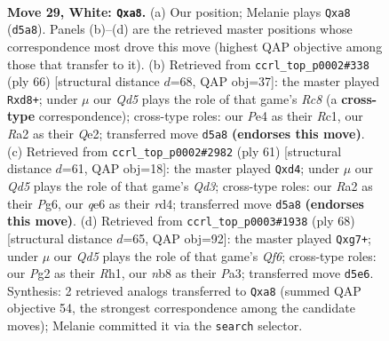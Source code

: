 \documentclass[11pt]{article}
\begin{document}
\clearpage

\begin{figure}[p]\centering
\begin{subfigure}{0.46\textwidth}\centering
\resizebox{\linewidth}{!}{%
\newchessgame
\chessboard[
  setfen={rn5r/5k2/1p1pq3/pPpQ4/4P3/7P/RP4P1/2K4R w - - 2 29},
  showmover=false,
  pgfstyle=straightmove, color=movearrow, markmove={d5-a8}
]}
\caption{}
\end{subfigure}\hfill
\begin{subfigure}{0.46\textwidth}\centering
\resizebox{\linewidth}{!}{%
\newchessgame
\chessboard[
  setfen={2Rr2k1/p4p2/3qp1p1/7p/1P1r4/P6P/4QPP1/2R3K1 w - - 3 34},
  showmover=false,
  pgfstyle=straightmove, color=movearrow, markmove={c8-d8}
]}
\caption{}
\end{subfigure}
\\[4pt]
\begin{subfigure}{0.46\textwidth}\centering
\resizebox{\linewidth}{!}{%
\newchessgame
\chessboard[
  setfen={8/5k2/p2qp1pp/1p3r2/3R4/1Q4PP/P4P2/4R1K1 b - - 0 31},
  showmover=false,
  pgfstyle=straightmove, color=movearrow, markmove={d6-d4}
]}
\caption{}
\end{subfigure}\hfill
\begin{subfigure}{0.46\textwidth}\centering
\resizebox{\linewidth}{!}{%
\newchessgame
\chessboard[
  setfen={r6k/p1rp1Pqp/4pQ2/8/8/P4PP1/1P6/R3K2R w KQ - 1 35},
  showmover=false,
  pgfstyle=straightmove, color=movearrow, markmove={f6-g7}
]}
\caption{}
\end{subfigure}
\caption{\textbf{Move 29, White: \texttt{Qxa8}.} (a) Our position; Melanie plays \texttt{Qxa8} (\texttt{d5a8}). Panels (b)--(d) are the retrieved master positions whose correspondence most drove this move (highest QAP objective among those that transfer to it). (b) Retrieved from \texttt{ccrl\_top\_p0002\#338} (ply 66) [structural distance $d$=68, QAP obj=37]: the master played \texttt{Rxd8+}; under $\mu$ our \emph{Qd5} plays the role of that game's \emph{Rc8} (a \textbf{cross-type} correspondence); cross-type roles: our \emph{P}e4 as their \emph{R}c1, our \emph{R}a2 as their \emph{Q}e2; transferred move \texttt{d5a8} \textbf{(endorses this move)}. (c) Retrieved from \texttt{ccrl\_top\_p0002\#2982} (ply 61) [structural distance $d$=61, QAP obj=18]: the master played \texttt{Qxd4}; under $\mu$ our \emph{Qd5} plays the role of that game's \emph{Qd3}; cross-type roles: our \emph{R}a2 as their \emph{P}g6, our \emph{q}e6 as their \emph{r}d4; transferred move \texttt{d5a8} \textbf{(endorses this move)}. (d) Retrieved from \texttt{ccrl\_top\_p0003\#1938} (ply 68) [structural distance $d$=65, QAP obj=92]: the master played \texttt{Qxg7+}; under $\mu$ our \emph{Qd5} plays the role of that game's \emph{Qf6}; cross-type roles: our \emph{P}g2 as their \emph{R}h1, our \emph{n}b8 as their \emph{P}a3; transferred move \texttt{d5e6}. Synthesis: 2 retrieved analogs transferred to \texttt{Qxa8} (summed QAP objective 54, the strongest correspondence among the candidate moves); Melanie committed it via the \texttt{search} selector.}
\label{fig:thought-m56}
\end{figure}
\end{document}

